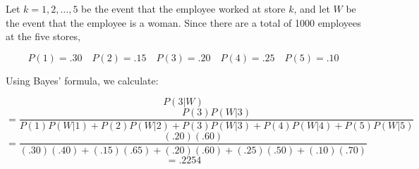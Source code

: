 \begin{solution}
    Let \( k = 1, 2, \dots , 5 \) be the event that the employee worked at store \( k \), and let \( W \) be the event that the employee is a woman. Since there are a total of 1000 employees at the five stores,

    \[ P(1) = .30 \quad P(2) = .15 \quad P(3) = .20 \quad P(4) = .25 \quad P(5) = .10 \]

    Using Bayes' formula, we calculate:

    \[ P(3 | W) \]
    \[ = \frac{P(3)P(W | 3)}{P(1)P(W | 1) + P(2)P(W | 2) + P(3)P(W | 3) + P(4)P(W | 4) + P(5)P(W | 5)} \]
    \[ = \frac{(.20)(.60)}{(.30)(.40) + (.15)(.65) + (.20)(.60) + (.25)(.50) + (.10)(.70)} \]
    \[ = .2254 \]
\end{solution}